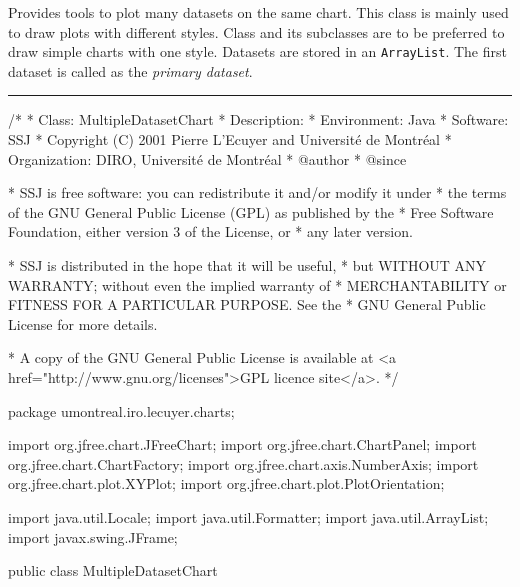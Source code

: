 
Provides tools to plot many datasets on the same chart.
This class is mainly used to draw plots with different styles.
Class  and
its subclasses are to be preferred to draw simple charts with one style.
Datasets are stored in an \texttt{ArrayList}. The first dataset is called
as the \textit{primary dataset}.

\bigskip\hrule
\begin{code}
\begin{hide}
/*
 * Class:        MultipleDatasetChart
 * Description:  
 * Environment:  Java
 * Software:     SSJ 
 * Copyright (C) 2001  Pierre L'Ecuyer and Université de Montréal
 * Organization: DIRO, Université de Montréal
 * @author       
 * @since

 * SSJ is free software: you can redistribute it and/or modify it under
 * the terms of the GNU General Public License (GPL) as published by the
 * Free Software Foundation, either version 3 of the License, or
 * any later version.

 * SSJ is distributed in the hope that it will be useful,
 * but WITHOUT ANY WARRANTY; without even the implied warranty of
 * MERCHANTABILITY or FITNESS FOR A PARTICULAR PURPOSE.  See the
 * GNU General Public License for more details.

 * A copy of the GNU General Public License is available at
   <a href="http://www.gnu.org/licenses">GPL licence site</a>.
 */
\end{hide}
package umontreal.iro.lecuyer.charts;\begin{hide}

import   org.jfree.chart.JFreeChart;
import   org.jfree.chart.ChartPanel;
import   org.jfree.chart.ChartFactory;
import   org.jfree.chart.axis.NumberAxis;
import   org.jfree.chart.plot.XYPlot;
import   org.jfree.chart.plot.PlotOrientation;

import   java.util.Locale;
import   java.util.Formatter;
import   java.util.ArrayList;
import   javax.swing.JFrame;\end{hide}

public class MultipleDatasetChart \begin{hide} {

   protected ArrayList<SSJXYSeriesCollection> datasetList;
   protected Axis XAxis;
   protected Axis YAxis;
   protected JFreeChart chart;
   protected boolean latexDocFlag = true;

   protected boolean autoRange = true;
   protected double[] manualRange;

   protected boolean grid = false;
   protected double xstepGrid;
   protected double ystepGrid;

\end{hide}
\end{code}

